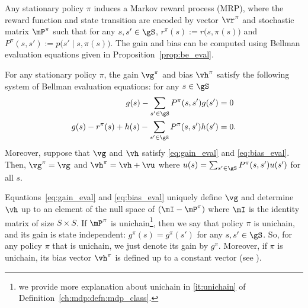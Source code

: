 Any stationary policy $\pi$ induces a Markov reward process (MRP), where the reward function and state transition are encoded by vector $\vr^\pi$ and stochastic matrix $\mP^\pi$ such that for any $s,s'\in\gS$, $r^\pi(s):=r\big(s,\pi(s)\big)$ and $P^\pi(s,s'):=p\big(s'\mid s,\pi(s)\big)$.
The gain and bias can be computed using Bellman evaluation equations given in Proposition~\ref{prop:be_eval}.
\begin{prop}
    \label{prop:be_eval}
    For any stationary policy $\pi$, the gain $\vg^\pi$ and bias $\vh^\pi$ satisfy the following system of Bellman evaluation equations: for any $s\in\gS$
    \begin{align}
        g(s) -\sum_{s'\in\gS}P^\pi(s,s')g(s') &=0 \label{eq:gain_eval}\\
        g(s) -r^\pi(s) +h(s) -\sum_{s'\in\gS}P^\pi(s,s')h(s') &=0. \label{eq:bias_eval}
    \end{align}
    Moreover, suppose that $\vg$ and $\vh$ satisfy \eqref{eq:gain_eval} and \eqref{eq:bias_eval}. Then, $\vg^\pi=\vg$ and $\vh^\pi=\vh+\vu$ where $u(s)=\sum_{s'\in\gS}P^\pi(s,s')u(s')$ for all $s$.
\end{prop}
Equations~\eqref{eq:gain_eval} and \eqref{eq:bias_eval} uniquely define $\vg$ and determine $\vh$ up to an element of the null space of $(\mI-\mP^\pi)$ where $\mI$ is the identity matrix of size $S\times S$.
If $\mP^\pi$ is unichain\footnote{we provide more explanation about unichain in \ref{it:unichain} of Definition~\ref{ch:mdp:defn:mdp_class}.}, then we say that policy $\pi$ is unichain, and its gain is state independent: $g^\pi(s)=g^\pi(s')$ for any $s,s'\in\gS$.
So, for any policy $\pi$ that is unichain, we just denote its gain by $g^\pi$.
Moreover, if $\pi$ is unichain, its bias vector $\vh^\pi$ is defined up to a constant vector (see \cite[Chapter 8]{puterman2014markov}).

